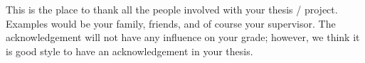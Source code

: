 This is the place to thank all the people involved with your thesis / project.
Examples would be your family, friends, and of course your supervisor.
The acknowledgement will not have any influence on your grade; however,
we think it is good style to have an acknowledgement in your thesis.
